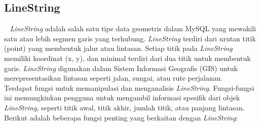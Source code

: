 \subsection{LineString}
\label{subs:linestring}
~\cite{oracle:24:mysql8.4}
\textit{LineString} adalah salah satu tipe data geometris dalam MySQL yang mewakili satu atau lebih segmen garis yang terhubung. \textit{LineString} terdiri dari urutan titik (point) yang membentuk jalur atau lintasan. Setiap titik pada \textit{LineString} memiliki koordinat (x, y), dan minimal terdiri dari dua titik untuk membentuk garis. \textit{LineString} digunakan dalam Sistem Informasi Geografis (GIS) untuk merepresentasikan lintasan seperti jalan, sungai, atau rute perjalanan.\\
Terdapat fungsi untuk memanipulasi dan menganalisis \textit{LineString}. Fungsi-fungsi ini memungkinkan pengguna untuk mengambil informasi spesifik dari objek \textit{LineString}, seperti titik awal, titik akhir, jumlah titik, atau panjang lintasan. Berikut adalah beberapa fungsi penting yang berkaitan dengan \textit{LineString}:
